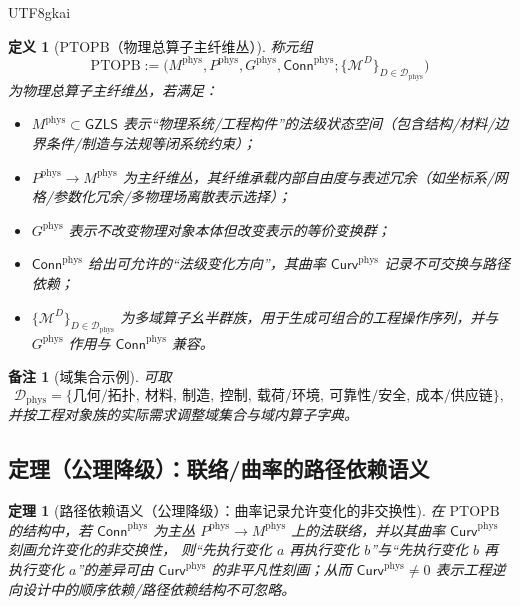 \documentclass[12pt]{article}
\newtheorem{definition}{定义}[section]
\newtheorem{theorem}{定理}[section]
\newtheorem{remark}{备注}[section]
\newcommand{\GZLS}{\ensuremath{\mathsf{GZLS}}}
\newcommand{\PTOPB}{\ensuremath{\mathrm{PTOPB}}}
\newcommand{\Conn}{\ensuremath{\mathsf{Conn}}}
\newcommand{\Curv}{\ensuremath{\mathsf{Curv}}}
\begin{document}
\begin{CJK*}{UTF8}{gkai}
\begin{definition}[\PTOPB{}（物理总算子主纤维丛）]
\label{def:ptopb}
称元组
\[
  \PTOPB
  :=
  \bigl(
    M^{\mathrm{phys}},
    P^{\mathrm{phys}},
    G^{\mathrm{phys}},
    \Conn^{\mathrm{phys}};
    \{\mathcal{M}^{D}\}_{D \in \mathcal{D}_{\mathrm{phys}}}
  \bigr)
\]
为物理总算子主纤维丛，若满足：
\begin{itemize}
  \item $M^{\mathrm{phys}}\subset\GZLS$ 表示“物理系统/工程构件”的法级状态空间（包含结构/材料/边界条件/制造与法规等闭系统约束）；
  \item $P^{\mathrm{phys}}\to M^{\mathrm{phys}}$ 为主纤维丛，其纤维承载内部自由度与表述冗余（如坐标系/网格/参数化冗余/多物理场离散表示选择）；
  \item $G^{\mathrm{phys}}$ 表示不改变物理对象本体但改变表示的等价变换群；
  \item $\Conn^{\mathrm{phys}}$ 给出可允许的“法级变化方向”，其曲率 $\Curv^{\mathrm{phys}}$ 记录不可交换与路径依赖；
  \item $\{\mathcal{M}^{D}\}_{D \in \mathcal{D}_{\mathrm{phys}}}$ 为多域算子幺半群族，用于生成可组合的工程操作序列，并与 $G^{\mathrm{phys}}$ 作用与
    $\Conn^{\mathrm{phys}}$ 兼容。
\end{itemize}
\end{definition}

\begin{remark}[域集合示例]
可取
\[
\mathcal{D}_{\mathrm{phys}}
=
\{\text{几何/拓扑},\ \text{材料},\ \text{制造},\ \text{控制},\ \text{载荷/环境},\ \text{可靠性/安全},\ \text{成本/供应链}\},
\]
并按工程对象族的实际需求调整域集合与域内算子字典。
\end{remark}

\subsection{定理（公理降级）：联络/曲率的路径依赖语义}

\begin{theorem}[路径依赖语义（公理降级）：曲率记录允许变化的非交换性]
\label{thm:connection-curvature-semantics}
在 \PTOPB{} 的结构中，若 $\Conn^{\mathrm{phys}}$ 为主丛 $P^{\mathrm{phys}}\to M^{\mathrm{phys}}$ 上的法联络，并以其曲率 $\Curv^{\mathrm{phys}}
  $ 刻画允许变化的非交换性，
则“先执行变化 $a$ 再执行变化 $b$”与“先执行变化 $b$ 再执行变化 $a$”的差异可由 $\Curv^{\mathrm{phys}}$ 的非平凡性刻画；从而 $\Curv^{\mathrm{phys}}\neq 0$
  表示工程逆向设计中的顺序依赖/路径依赖结构不可忽略。
\end{theorem}


\end{CJK*}
\end{document}
